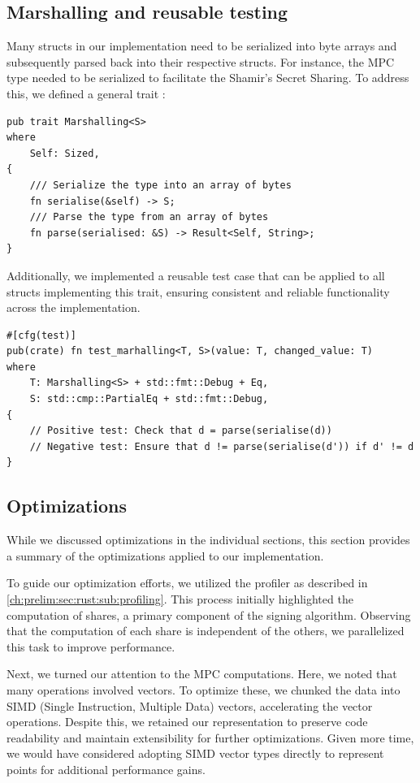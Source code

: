 \documentclass[11pt]{report}
\theoremstyle{definition}
\theoremstyle{plain}
\begin{document}
\subsection{Marshalling and reusable testing}\label{sub:testing_our_implementation}
Many structs in our implementation need to be serialized into byte arrays and subsequently parsed back into their respective structs. For instance, the MPC  type needed to be serialized to facilitate the Shamir's Secret Sharing. To address this, we defined a general trait :

\begin{verbatim}
pub trait Marshalling<S>
where
    Self: Sized,
{
    /// Serialize the type into an array of bytes
    fn serialise(&self) -> S;
    /// Parse the type from an array of bytes
    fn parse(serialised: &S) -> Result<Self, String>;
}
\end{verbatim}

Additionally, we implemented a reusable test case that can be applied to all structs implementing this trait, ensuring consistent and reliable functionality across the implementation.

\begin{verbatim}
#[cfg(test)]
pub(crate) fn test_marhalling<T, S>(value: T, changed_value: T)
where
    T: Marshalling<S> + std::fmt::Debug + Eq,
    S: std::cmp::PartialEq + std::fmt::Debug,
{
    // Positive test: Check that d = parse(serialise(d))
    // Negative test: Ensure that d != parse(serialise(d')) if d' != d
}
\end{verbatim}

\subsection{Optimizations}
While we discussed optimizations in the individual sections, this section provides a summary of the optimizations applied to our implementation.

To guide our optimization efforts, we utilized the profiler as described in \autoref{ch:prelim:sec:rust:sub:profiling}. This process initially highlighted the computation of shares, a primary component of the signing algorithm. Observing that the computation of each share is independent of the others, we parallelized this task to improve performance.

Next, we turned our attention to the MPC computations. Here, we noted that many operations involved vectors. To optimize these, we chunked the data into SIMD (Single Instruction, Multiple Data) vectors, accelerating the vector operations. Despite this, we retained our  representation to preserve code readability and maintain extensibility for further optimizations. Given more time, we would have considered adopting SIMD vector types directly to represent points for additional performance gains.
\end{document}

